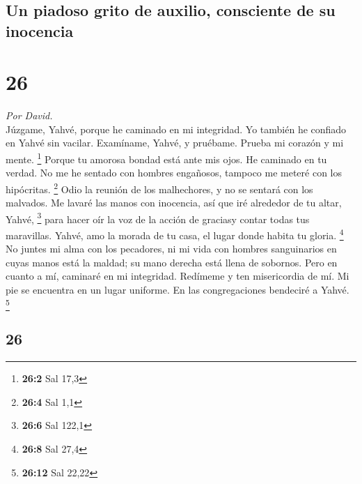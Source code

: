 \begin{paracol}{2}
{\subsection{Un piadoso grito de auxilio, consciente de su
inocencia}\label{un-piadoso-grito-de-auxilio-consciente-de-su-inocencia}}

\hypertarget{section-50}{%
\section{26}\label{section-50}}

\emph{Por David.}\\
 Júzgame, Yahvé, porque he caminado en mi integridad. Yo
también he confiado en Yahvé sin vacilar.  Examíname,
Yahvé, y pruébame. Prueba mi corazón y mi mente. \footnote{\textbf{26:2}
  Sal 17,3}  Porque tu amorosa bondad está ante mis ojos.
He caminado en tu verdad.  No me he sentado con hombres
engañosos, tampoco me meteré con los hipócritas. \footnote{\textbf{26:4}
  Sal 1,1}  Odio la reunión de los malhechores, y no se
sentará con los malvados.  Me lavaré las manos con
inocencia, así que iré alrededor de tu altar, Yahvé, \footnote{\textbf{26:6}
  Sal 122,1}  para hacer oír la voz de la acción de
graciasy contar todas tus maravillas.  Yahvé, amo la
morada de tu casa, el lugar donde habita tu gloria. \footnote{\textbf{26:8}
  Sal 27,4}  No juntes mi alma con los pecadores, ni mi
vida con hombres sanguinarios  en cuyas manos está la
maldad; su mano derecha está llena de sobornos.  Pero en
cuanto a mí, caminaré en mi integridad. Redímeme y ten misericordia de
mí.  Mi pie se encuentra en un lugar uniforme. En las
congregaciones bendeciré a Yahvé. \footnote{\textbf{26:12} Sal 22,22}

\switchcolumn
\begin{otherlanguage}{english}

\hypertarget{section-51}{%
\section{26}\label{section-51}}


\end{otherlanguage}
\end{paracol}
